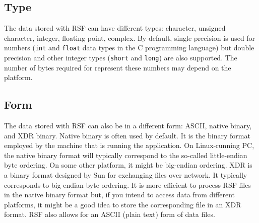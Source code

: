 \subsection{Type}

The data stored with RSF can have different types: character, unsigned
character, integer, floating point, complex. By default, single
precision is used for numbers (\texttt{int} and \texttt{float} data
types in the C programming language) but double precision and other
integer types (\texttt{short} and \texttt{long}) are also
supported. The number of bytes required for represent these numbers
may depend on the platform.

\subsection{Form}

The data stored with RSF can also be in a different form: ASCII, native
binary, and XDR binary. Native binary is often used by default. It is the
binary format employed by the machine that is running the application. On
Linux-running PC, the native binary format will typically correspond to the
so-called little-endian byte ordering. On some other platform, it might be
big-endian ordering. XDR is a binary format designed by Sun for exchanging
files over network. It typically corresponds to big-endian byte ordering. It
is more efficient to process RSF files in the native binary format but, if you
intend to access data from different platforms, it might be a good idea to
store the corresponding file in an XDR format. RSF also allows for an ASCII
(plain text) form of data files. 

